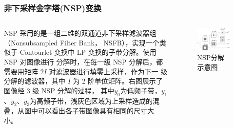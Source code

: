 \documentclass[10pt,aspectratio=43,mathserif]{beamer}
\begin{document}
    \begin{frame}
		  \frametitle{\textbf{非下采样金字塔(NSP)变换}}
            \begin{columns}
                \footnotesize
                NSP 采用的是一组二维的双通道非下采样滤波器组（Nonsubsampled Filter Bank，
NSFB），实现一个类似于 Contourlet 变换中 LP 变换的子带分解。使用 NSP 对图像进行
分解时，在每一级 NSP 分解后，都需要用矩阵 $2I$ 对滤波器进行填零上采样，作为下一
级分解的滤波器，其中 $I$ 为 2 阶单位矩阵。右图展示了图像经 3 级 NSP 分解的过程，
其中$y_0$为低频子带，$y_1$、$y_2$、$y_3$为高频子带，浅灰色区域为上采样造成的混叠，从图中可以看出各子带图像具有相同的尺寸大小。

                \begin{figure}[!t]
                    \centering
                    \includegraphics[width=1.1\textwidth]{./figures/nsct/NSP.png}
                    \caption{NSP分解示意图}
                \end{figure}
        \end{columns}
    \end{frame}
\end{document}
